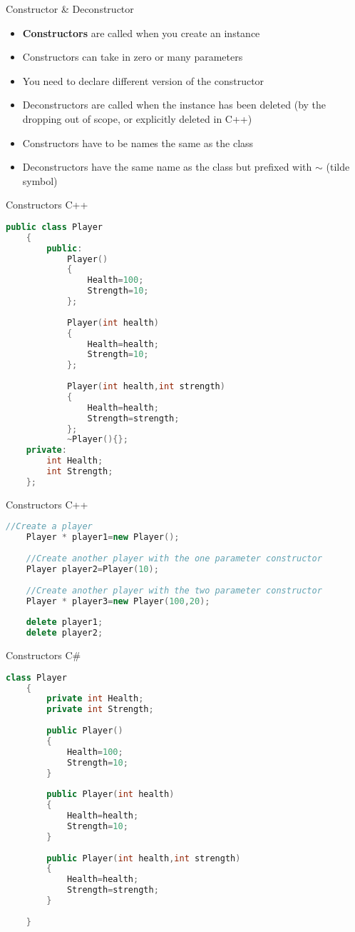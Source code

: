 \begin{frame}{Constructor \& Deconstructor}
	\begin{itemize}
		\pause \item \textbf{Constructors} are called when you create an instance
		\pause \item Constructors can take in zero or many parameters
		\pause \item You need to declare different version of the constructor
		\pause \item Deconstructors are called when the instance has been deleted (by the dropping out of scope, or explicitly deleted in C++)
		\pause \item Constructors have to be names the same as the class
		\pause \item Deconstructors have the same name as the class but prefixed with \textbf{$\sim$} (tilde symbol)
	\end{itemize}
\end{frame}

\begin{frame}[fragile]{Constructors C++}
	\begin{lstlisting}[language=C++,basicstyle=\tiny,]
	public class Player
	{
		public:
			Player()
			{
				Health=100;
				Strength=10;
			};
			
			Player(int health)
			{
				Health=health;
				Strength=10;
			};
			
			Player(int health,int strength)
			{
				Health=health;
				Strength=strength;
			};
			~Player(){};
	private:
		int Health;
		int Strength;
	};	
	\end{lstlisting}
\end{frame}

\begin{frame}[fragile]{Constructors C++}
	\begin{lstlisting}[language=C++,basicstyle=\tiny,]
	//Create a player
	Player * player1=new Player();
	
	//Create another player with the one parameter constructor
	Player player2=Player(10);
	
	//Create another player with the two parameter constructor
	Player * player3=new Player(100,20);
	
	delete player1;
	delete player2;
	\end{lstlisting}
\end{frame}

\begin{frame}[fragile]{Constructors C\#}
	\begin{lstlisting}[language=C++,basicstyle=\tiny,]
	class Player
	{
		private int Health;
		private int Strength;
		
		public Player()
		{
			Health=100;
			Strength=10;
		}
		
		public Player(int health)
		{
			Health=health;
			Strength=10;	
		}
		
		public Player(int health,int strength)
		{
			Health=health;
			Strength=strength;
		}
		
	}
	\end{lstlisting}
\end{frame}

